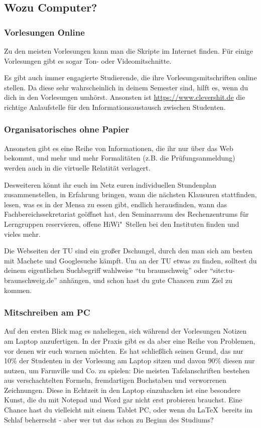 \begin{multicols}{2}
	\subsection{Wozu Computer?}
		\subsubsection{Vorlesungen Online}
			Zu den meisten Vorlesungen kann man die Skripte im Internet finden. Für einige Vorlesungen gibt es sogar Ton- oder Videomitschnitte.

			Es gibt auch immer engagierte Studierende, die ihre Vorlesungsmitschriften online stellen. Da diese sehr wahrscheinlich in deinem Semester sind, hilft es, wenn du dich in den Vorlesungen umhörst. Ansonsten ist \url{https://www.clevershit.de} die richtige Anlaufstelle für den Informationsaustausch zwischen Studenten.

		\subsubsection{Organisatorisches ohne Papier}
			Ansonsten gibt es eine Reihe von Informationen, die ihr nur über das Web bekommt, und mehr und mehr Formalitäten (z.B. die Prüfungsanmeldung) werden auch in die virtuelle Relatität verlagert.

			Desweiteren könnt ihr euch im Netz euren individuellen Stundenplan zusammenstellen, in Erfahrung bringen, wann die nächsten Klausuren stattfinden, lesen, was es in der Mensa zu essen gibt, endlich herausfinden, wann das Fachbereichssekretariat geöffnet hat, den Seminarraum des Rechenzentrums für Lerngruppen reservieren, offene HiWi"~Stellen bei den Instituten finden und vieles mehr.

			Die Webseiten der TU sind ein großer Dschungel, durch den man sich am besten  mit Machete und Googlesuche kämpft. Um an der TU etwas zu finden, solltest du deinem eigentlichen Suchbegriff wahlweise \enquote{tu braunschweig} oder \enquote{site:tu-braunschweig.de} anhängen, und schon hast du gute Chancen zum Ziel zu kommen.

		\subsubsection{Mitschreiben am PC}
			Auf den ersten Blick mag es naheliegen, sich während der Vorlesungen Notizen  am Laptop anzufertigen. In der Praxis gibt es da aber eine Reihe von Problemen, vor denen wir euch warnen möchten. Es hat schließlich seinen Grund, das nur 10\% der Studenten in der Vorlesung am Laptop sitzen und davon 90\% diesen nur nutzen, um Farmville und Co. zu spielen: Die meisten Tafelanschriften bestehen  aus verschachtelten Formeln, fremdartigen Buchstaben und verworrenen Zeichnungen. Diese in Echtzeit in den Laptop einzuhacken ist eine besondere Kunst, die du mit Notepad und Word gar nicht erst probieren brauchst. Eine Chance hast du vielleicht mit einem Tablet PC, oder wenn du \LaTeX\ bereits im Schlaf beherrscht - aber wer tut das schon zu Beginn des Studiums?


\end{multicols}
